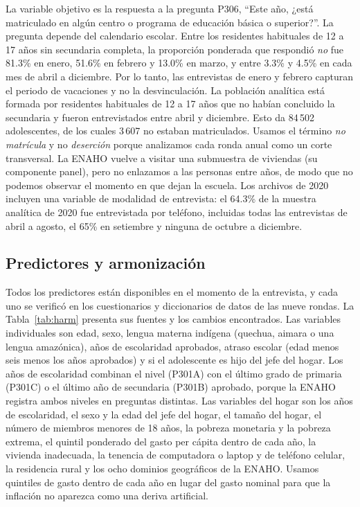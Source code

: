 \documentclass[conference]{IEEEtran}
\begin{document}
La variable objetivo es la respuesta a la pregunta P306, ``Este año, ¿está matriculado en algún centro o programa de educación básica o superior?''. La pregunta depende del calendario escolar. Entre los residentes habituales de 12 a 17 años sin secundaria completa, la proporción ponderada que respondió \textit{no} fue 81.3\% en enero, 51.6\% en febrero y 13.0\% en marzo, y entre 3.3\% y 4.5\% en cada mes de abril a diciembre. Por lo tanto, las entrevistas de enero y febrero capturan el periodo de vacaciones y no la desvinculación. La población analítica está formada por residentes habituales de 12 a 17 años que no habían concluido la secundaria y fueron entrevistados entre abril y diciembre. Esto da 84\,502 adolescentes, de los cuales 3\,607 no estaban matriculados. Usamos el término \textit{no matrícula} y no \textit{deserción} porque analizamos cada ronda anual como un corte transversal. La ENAHO vuelve a visitar una submuestra de viviendas (su componente panel), pero no enlazamos a las personas entre años, de modo que no podemos observar el momento en que dejan la escuela. Los archivos de 2020 incluyen una variable de modalidad de entrevista: el 64.3\% de la muestra analítica de 2020 fue entrevistada por teléfono, incluidas todas las entrevistas de abril a agosto, el 65\% en setiembre y ninguna de octubre a diciembre.

\subsection{Predictores y armonización}
Todos los predictores están disponibles en el momento de la entrevista, y cada uno se verificó en los cuestionarios y diccionarios de datos de las nueve rondas. La Tabla~\ref{tab:harm} presenta sus fuentes y los cambios encontrados. Las variables individuales son edad, sexo, lengua materna indígena (quechua, aimara o una lengua amazónica), años de escolaridad aprobados, atraso escolar (edad menos seis menos los años aprobados) y si el adolescente es hijo del jefe del hogar. Los años de escolaridad combinan el nivel (P301A) con el último grado de primaria (P301C) o el último año de secundaria (P301B) aprobado, porque la ENAHO registra ambos niveles en preguntas distintas. Las variables del hogar son los años de escolaridad, el sexo y la edad del jefe del hogar, el tamaño del hogar, el número de miembros menores de 18 años, la pobreza monetaria y la pobreza extrema, el quintil ponderado del gasto per cápita dentro de cada año, la vivienda inadecuada, la tenencia de computadora o laptop y de teléfono celular, la residencia rural y los ocho dominios geográficos de la ENAHO. Usamos quintiles de gasto dentro de cada año en lugar del gasto nominal para que la inflación no aparezca como una deriva artificial.
\end{document}
